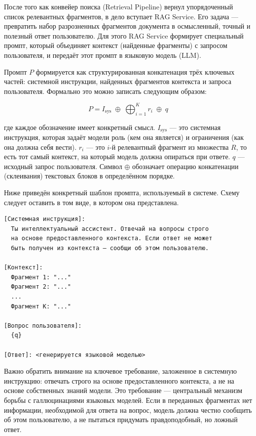 После того как конвейер поиска (Retrieval Pipeline) вернул упорядоченный список релевантных фрагментов, в дело вступает RAG Service. Его задача — превратить набор разрозненных фрагментов документа в осмысленный, точный и полезный ответ пользователю. Для этого RAG Service формирует специальный промпт, который объединяет контекст (найденные фрагменты) с запросом пользователя, и передаёт этот промпт в языковую модель (LLM).

Промпт $P$ формируется как структурированная конкатенация трёх ключевых частей: системной инструкции, найденных фрагментов контекста и запроса пользователя. Формально это можно записать следующим образом:

\begin{equation}
P = I_{\text{sys}} \;\oplus\; \bigoplus_{i=1}^{K} r_i \;\oplus\; q
\end{equation}

где каждое обозначение имеет конкретный смысл. $I_{\text{sys}}$ — это системная инструкция, которая задаёт модели роль (кем она является) и ограничения (как она должна себя вести). $r_i$ — это $i$-й релевантный фрагмент из множества $R$, то есть тот самый контекст, на который модель должна опираться при ответе. $q$ — исходный запрос пользователя. Символ $\oplus$ обозначает операцию конкатенации (склеивания) текстовых блоков в определённом порядке.

Ниже приведён конкретный шаблон промпта, используемый в системе. Схему следует оставить в том виде, в котором она представлена.

\begin{verbatim}
[Системная инструкция]:
  Ты интеллектуальный ассистент. Отвечай на вопросы строго
  на основе предоставленного контекста. Если ответ не может
  быть получен из контекста — сообщи об этом пользователю.

[Контекст]:
  Фрагмент 1: "..."
  Фрагмент 2: "..."
  ...
  Фрагмент K: "..."

[Вопрос пользователя]:
  {q}

[Ответ]: <генерируется языковой моделью>
\end{verbatim}

Важно обратить внимание на ключевое требование, заложенное в системную инструкцию: отвечать строго на основе предоставленного контекста, а не на основе собственных знаний модели. Это требование — центральный механизм борьбы с галлюцинациями языковых моделей. Если в переданных фрагментах нет информации, необходимой для ответа на вопрос, модель должна честно сообщить об этом пользователю, а не пытаться придумать правдоподобный, но ложный ответ.

